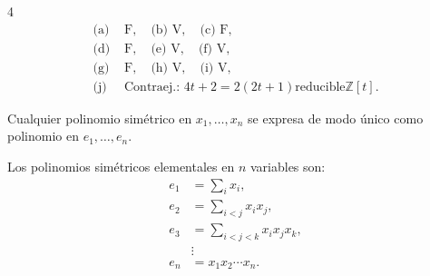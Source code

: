 \documentclass[landscape,a4paper]{article}
\begin{document}
\begin{multicols}{4}
\begin{align*}
\text{(a) } &\text{F},\quad \text{(b) } \text{V},\quad \text{(c) } \text{F},\\
\text{(d) } &\text{F},\quad \text{(e) } \text{V},\quad \text{(f) } \text{V},\\
\text{(g) } &\text{F},\quad \text{(h) } \text{V},\quad \text{(i) } \text{V},\\
\text{(j) } &\text{Contraej.: } 4t+2=2(2t+1)\text{reducible}\mathbb{Z}[t].
\end{align*}

\begin{tcolorbox}[colback=white,colframe=red!80!black,colbacktitle=red!80!black,
                  coltitle=white,title={Teorema (Fundamental de los polinomios simétricos)}]
Cualquier polinomio simétrico en $x_1,\dots,x_n$ se expresa de modo único como polinomio en $e_1,\dots,e_n$.
\end{tcolorbox}

\begin{tcolorbox}[colback=white,colframe=blue!80!black,colbacktitle=blue!80!black,
                  coltitle=white,title={Definición: Polinomios simétricos elementales}]
Los polinomios simétricos elementales en $n$ variables son:
\begin{align*}
e_1 &= \sum_i x_i,\quad\\
e_2 &= \sum_{i<j}x_ix_j,\quad\\
e_3 &= \sum_{i<j<k}x_ix_jx_k,\\
& \vdots\\
e_n&= x_1x_2\cdots x_n.
\end{align*}
\end{tcolorbox}


\end{multicols}
\end{document}
